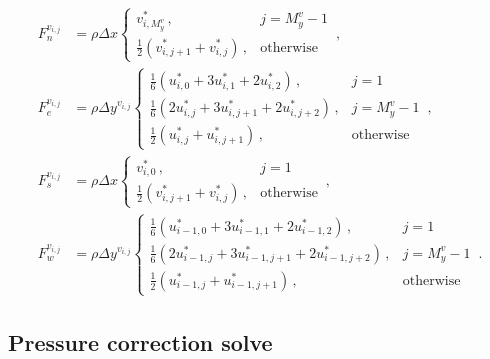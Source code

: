 \documentclass{article}
\begin{document}
\begin{subequations}
	\begin{align}
		F_n^{v_{i,j}} & = \rho \Delta x \begin{cases}
			v^*_{i, M_y^v}\,, & j = M_y^v - 1 \\
			\frac{1}{2} \left(v^*_{i, j+1} + v^*_{i,j}\right)\,, & \text{otherwise}
		\end{cases}\,, \\
		F_e^{v_{i,j}} & = \rho \Delta y^{v_{i,j}} \begin{cases}
			\frac{1}{6} \left( u^*_{i, 0} + 3 u^*_{i, 1} + 2 u^*_{i, 2} \right)\,, & j = 1 \\
			\frac{1}{6} \left( 2 u^*_{i, j} + 3 u^*_{i, j + 1} + 2 u^*_{i, j + 2} \right)\,, & j = M_y^v - 1 \\
			\frac{1}{2} \left( u^*_{i, j} + u^*_{i, j + 1} \right)\,, & \text{otherwise} 
		\end{cases}\,, \\
		F_s^{v_{i,j}} & = \rho \Delta x \begin{cases}
			v^*_{i, 0}\,, & j = 1 \\
			\frac{1}{2} \left(v^*_{i, j+ 1} + v^*_{i,j}\right)\,, & \text{otherwise}
		\end{cases}\,, \\
		F_w^{v_{i,j}} & = \rho \Delta y^{v_{i,j}} \begin{cases}
			\frac{1}{6} \left( u^*_{i - 1, 0} + 3 u^*_{i - 1, 1} + 2 u^*_{i - 1, 2} \right)\,, & j = 1 \\
			\frac{1}{6} \left( 2 u^*_{i - 1, j} + 3 u^*_{i - 1, j + 1} + 2 u^*_{i - 1, j + 2} \right)\,, & j = M_y^v - 1 \\
			\frac{1}{2} \left( u^*_{i - 1, j} + u^*_{i - 1, j + 1} \right)\,, & \text{otherwise} 
			\end{cases}\,.
	\end{align}
\end{subequations}

\subsection{Pressure correction solve}
\label{subsec:pc-solve}
\end{document}

